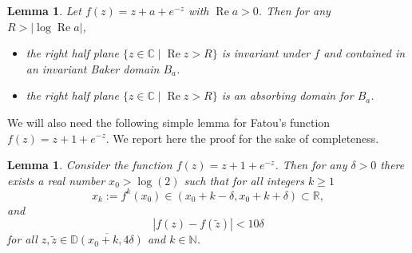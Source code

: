 \documentclass[a4paper, 12pt, twoside]{amsart}
\newtheorem{lem}[thm]{Lemma}
\theoremstyle{definition}
\numberwithin{equation}{section}
\newcommand{\violet }{\color{Violet}}
\newcommand{\re}{\operatorname{Re}}
\newcommand{\C}{{\mathbb C}}
\newcommand{\D}{{\mathbb D}}
\newcommand{\N}{{\mathbb N}}
\newcommand{\R}{{\mathbb R}}
\newcommand{\ra}{\rightarrow}
\renewcommand{\phi}{\varphi}
\begin{document}
 \begin{lem}\label{lem:basic Baker 1d}
 Let  $f(z)=z+a+e^{-z}$ with $\re a>0$. Then  for any $R>|\log \re a|$,
 \begin{itemize}
 \item the right half plane $\{z\in\C\mid\re z>R\}$ is invariant under $f$ and contained in an invariant Baker domain $B_a$.
 \item the right half plane $\{z\in\C\mid\re z>R\}$ is an absorbing domain for $B_a$.
 \end{itemize}
 \end{lem}
%    

We will also need the following simple lemma for Fatou's function $f(z)=z+1+e^{-z}$. We report here the proof for the sake of completeness.

\begin{lem}\label{LEMMA:OneDim}
    Consider the function $f(z) = z + 1 + e^{-z}$. Then for any $\delta>0$ there exists a real number $x_0 > \log(2)$ such that for all integers $k\ge 1$
        \begin{equation}\label{LEMMA:OneDim:EQ1}
            x_k := f^{k}(x_0) \in (x_0 + k - \delta, x_0 + k + \delta) \subset \R,
        \end{equation}
        and
        \begin{equation}\label{LEMMA:OneDim:EQ2}
            |f(z) - f(\tilde{z})| < 10\delta
        \end{equation}
        for all $z,\tilde{z}\in \overline{\D(x_0 + k, 4\delta)}$ and $k\in\N$.
\end{lem}
\end{document}

